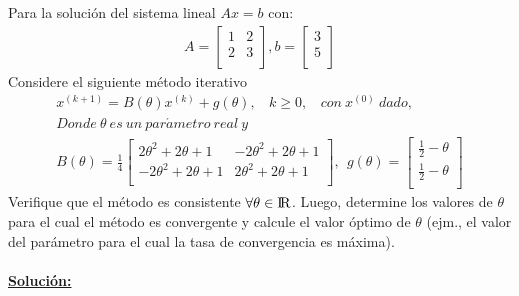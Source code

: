 Para la solución del sistema lineal $Ax = b$ con:\\
\begin{gather*}
A = 
\begin{bmatrix}
       1   &     2 \\
       2   &     3 \\
\end{bmatrix},
b = 
\begin{bmatrix}
    3 \\
    5 \\
\end{bmatrix}
\end{gather*}
Considere el siguiente método iterativo
\begin{gather*}
x^{(k+1)} = B(\theta)x^{(k)} + g(\theta), \>\>\>\> k \geq 0, \>\>\>\> con\>x^{(0)}\>dado,\\
Donde\>\theta\>es\>un\>par\acute ametro\>real\>y \\
B(\theta) = \frac{1}{4}\begin{bmatrix}
       2\theta^2 + 2\theta + 1   &     -2\theta^2 + 2\theta + 1 \\
       -2\theta^2 + 2\theta + 1   &     2\theta^2 + 2\theta + 1 \\
\end{bmatrix},\>\>
g(\theta)= \begin{bmatrix}
    \frac{1}{2} -\theta \\
    \frac{1}{2} -\theta \\
\end{bmatrix}
\end{gather*}
Verifique que el método es consistente $\forall\theta\in {\rm I\!R}$. Luego, determine los valores de $\theta$ para el cual el método es convergente y calcule el valor óptimo de $\theta$ (ejm., el valor del parámetro para el cual la tasa de convergencia es máxima).\\\\

\textbf{\underline{Solución:}}

